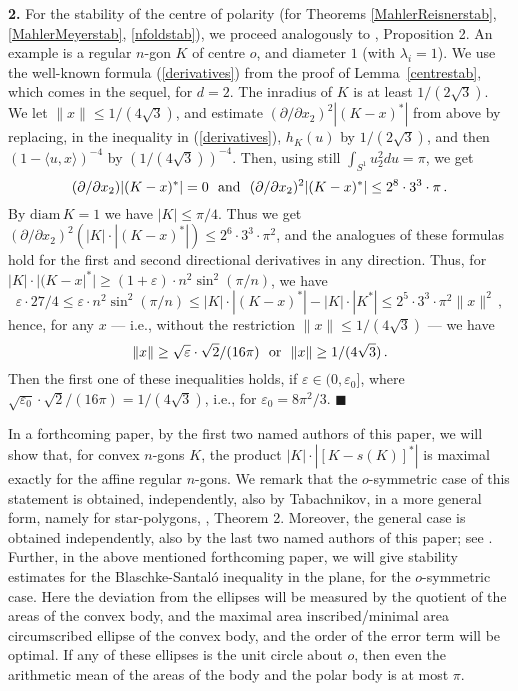 \documentclass[12pt]{article}
\begin{document}
{\bf{2.}}  
For the stability of the centre of polarity (for Theorems 
\ref{MahlerReisnerstab}, \ref{MahlerMeyerstab}, \ref{nfoldstab}), we proceed
analogously to \cite{KR}, Proposition 2.
An example is a
regular $n$-gon $K$ of centre $o$, and diameter $1$ (with $\lambda _i=1$). 
We use the well-known formula (\ref{derivatives}) from the proof of 
Lemma~\ref{centrestab}, which comes in the sequel, for $d=2$. 
The inradius of $K$ is at least $1/(2
\sqrt{3})$. We let $\| x \| \le 1/(4 \sqrt{3})$, and estimate $(\partial /
\partial x_2)^2 | (K-x)^* |$ from above
by replacing, in the inequality in (\ref{derivatives}), $h_K(u)$ by
$1/(2 \sqrt{3})$, and then $(1- \langle u,x \rangle )^{-4}$ by 
$ \left( 1/(4 \sqrt{3}) \right) ^{-4}$. Then, using still
$\int _{S^1}u_2^2du=\pi $, we get 
$$
(\partial / \partial x_2) | (K-x)^* | =0 {\text{\,\,\,\,and\,\,\,\,}} 
(\partial / \partial x_2)^2 | (K-x)^* | \le 2^8 \cdot 3^3 \cdot \pi \,.
$$
By ${\text{diam}}\,K =1$ we have $|K| \le \pi/4$. Thus we get
$(\partial / \partial x_2)^2 (|K| \cdot | (K-x)^* |) \le 2^6 \cdot 3^3 \cdot
\pi ^2$, and the
analogues of these formulas hold for the first and 
second directional derivatives in any
direction. Thus, for $|K| \cdot |(K-x|^*| \ge (1+\varepsilon ) \cdot n^2 \sin
^2 ( \pi /n )$, we have
$$
\varepsilon \cdot 27/4 \le \varepsilon \cdot n^2 \sin ^2 ( \pi /n ) \le
|K| \cdot | (K-x)^* | - |K| \cdot |K^*| \le 2^5 \cdot 3^3 \cdot \pi ^2 \| x \|
^2\,,
$$
hence, for any $x$ --- i.e., without the restriction $\| x \| \le 1/(4
\sqrt{3})$ --- we have
 $$ 
\| x \| \ge \sqrt{ \varepsilon } \cdot \sqrt{2} 
/ (16 \pi ) {\text{\,\,\,\,or\,\,\,\,}} 
\| x \| \ge 1/(4 \sqrt{3})\,.
$$
Then the first one of these inequalities holds, 
if $\varepsilon \in (0, \varepsilon _0]$,
where $\sqrt{ \varepsilon _0} \cdot \sqrt{2} /(16 \pi ) =1/(4 \sqrt{3})$,
i.e., for $\varepsilon _0= 8 \pi ^2 /3$. $ \blacksquare $

\hskip0.0cm


In a forthcoming paper, by the first two named authors of
this paper, 
we will show that, for convex $n$-gons $K$, 
the product $|K| \cdot |  [ K-s(K) ] ^* | $ is
maximal exactly for the affine regular $n$-gons. We remark that the
$o$-symmetric case of this statement is obtained, independently, also by
Tabachnikov, in a more general form, namely for star-polygons, \cite{Ta},
Theorem 2.
Moreover, the general case is obtained independently, also by the last two
named authors of this paper; see \cite{MR}.
Further, in the above mentioned forthcoming paper, we will give stability
estimates for the Blaschke-Santal\'o inequality in the plane, 
for the $o$-symmetric case.
Here the deviation from the ellipses will be
measured by the quotient of the areas of the convex body, and the maximal area
inscribed/minimal area circumscribed ellipse of the convex body, and the order
of the error term will be optimal.
If any of these ellipses is the unit circle about $o$, then even the
arithmetic mean of the areas of the body and the polar body is at most $ \pi $.
\end{document}
